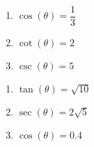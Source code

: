 \documentclass{ximera}
\begin{document}
\begin{multicols}{3}

\begin{enumerate}

\setcounter{enumi}{\value{HW}}


\item  $\cos(\theta) = \dfrac{1}{3}$ 

\item  $\cot(\theta) = 2$ 

\item  $\csc(\theta) = 5$ 

\setcounter{HW}{\value{enumi}}

\end{enumerate}

\end{multicols}

\begin{multicols}{3}

\begin{enumerate}

\setcounter{enumi}{\value{HW}}

\item  $\tan(\theta) = \sqrt{10}$ 
\item  $\sec(\theta) = 2\sqrt{5}$ 
\item  $\cos(\theta) = 0.4$    \label{findothercirclastapprighttrig}

\setcounter{HW}{\value{enumi}}

\end{enumerate}

\end{multicols}
\end{document}
